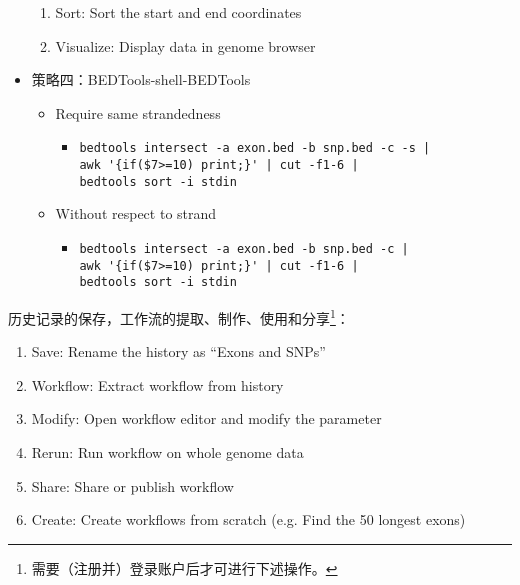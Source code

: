 \documentclass[11pt,a4paper,twoside]{book}
\begin{document}
\begin{itemize}
\begin{enumerate}
      \item Sort: Sort the start and end coordinates
      \item Visualize: Display data in genome browser
    \end{enumerate}
  \item 策略四：BEDTools-shell-BEDTools
    \begin{itemize}
      \item Require same strandedness
	\begin{itemize}
	  \item \verb+bedtools intersect -a exon.bed -b snp.bed -c -s |+\\
                \verb+awk '{if($7>=10) print;}' | cut -f1-6 |+\\
	        \verb+bedtools sort -i stdin+
	\end{itemize}
      \item Without respect to strand
	\begin{itemize}
	  \item \verb+bedtools intersect -a exon.bed -b snp.bed -c |+\\
                \verb+awk '{if($7>=10) print;}' | cut -f1-6 |+\\
	        \verb+bedtools sort -i stdin+
	\end{itemize}
    \end{itemize}
\end{itemize}

历史记录的保存，工作流的提取、制作、使用和分享\footnote{需要（注册并）登录账户后才可进行下述操作。}：
\begin{enumerate}
  \item Save: Rename the history as ``Exons and SNPs''
  \item Workflow: Extract workflow from history
  \item Modify: Open workflow editor and modify the parameter
  \item Rerun: Run workflow on whole genome data
  \item Share: Share or publish workflow
  \item Create: Create workflows from scratch (e.g. Find the 50 longest exons)
\end{enumerate}
\end{document}
